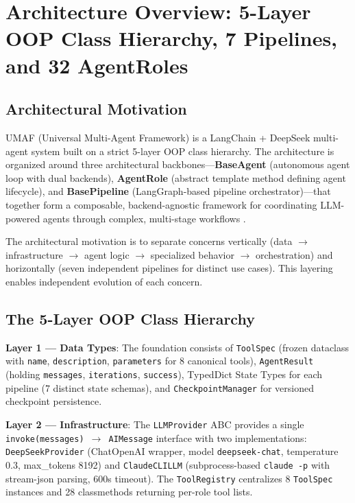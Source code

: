 \section{Architecture Overview: 5-Layer OOP Class Hierarchy, 7 Pipelines, and 32 AgentRoles}
\label{sec:architecture}

\subsection{Architectural Motivation}

UMAF (Universal Multi-Agent Framework) is a LangChain \cite{langgraph} + DeepSeek \cite{deepseekv3} multi-agent system built on a strict 5-layer OOP class hierarchy. The architecture is organized around three architectural backbones---\textbf{BaseAgent} (autonomous agent loop with dual backends), \textbf{AgentRole} (abstract template method defining agent lifecycle), and \textbf{BasePipeline} (LangGraph-based pipeline orchestrator)---that together form a composable, backend-agnostic framework for coordinating LLM-powered agents through complex, multi-stage workflows \cite{autogpt}.

The architectural motivation is to separate concerns vertically (data $\rightarrow$ infrastructure $\rightarrow$ agent logic $\rightarrow$ specialized behavior $\rightarrow$ orchestration) and horizontally (seven independent pipelines for distinct use cases). This layering enables independent evolution of each concern.

\subsection{The 5-Layer OOP Class Hierarchy}

\textbf{Layer 1 --- Data Types}: The foundation consists of \texttt{ToolSpec} (frozen dataclass with \texttt{name}, \texttt{description}, \texttt{parameters} for 8 canonical tools), \texttt{AgentResult} (holding \texttt{messages}, \texttt{iterations}, \texttt{success}), TypedDict State Types for each pipeline (7 distinct state schemas), and \texttt{CheckpointManager} for versioned checkpoint persistence.

\textbf{Layer 2 --- Infrastructure}: The \texttt{LLMProvider} ABC provides a single \texttt{invoke(messages) $\rightarrow$ AIMessage} interface with two implementations: \texttt{DeepSeekProvider} (ChatOpenAI wrapper, model \texttt{deepseek-chat}, temperature 0.3, max\_tokens 8192) and \texttt{ClaudeCLILLM} (subprocess-based \texttt{claude -p} with stream-json parsing, 600s timeout). The \texttt{ToolRegistry} centralizes 8 \texttt{ToolSpec} instances and 28 classmethods returning per-role tool lists.

